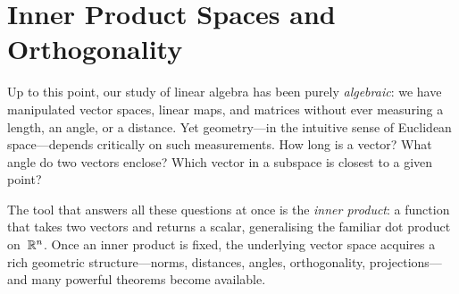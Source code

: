 
\chapter{Inner Product Spaces and Orthogonality}\label{ch:inner-products}


Up to this point, our study of linear algebra has been purely
\emph{algebraic}: we have manipulated vector spaces, linear maps, and
matrices without ever measuring a length, an angle, or a distance.  Yet
geometry---in the intuitive sense of Euclidean space---depends critically
on such measurements.  How long is a vector?  What angle do two vectors
enclose?  Which vector in a subspace is closest to a given point?

The tool that answers all these questions at once is the \emph{inner
product}: a function that takes two vectors and
returns a scalar, generalising the familiar dot product on~${\mathbb{R}}^n$.  Once
an inner product is fixed, the underlying vector space acquires a rich
geometric structure---norms, distances, angles, orthogonality,
projections---and many powerful theorems become available.

\begin{center}
\label{fig:inner-product-angle}
\end{center}

